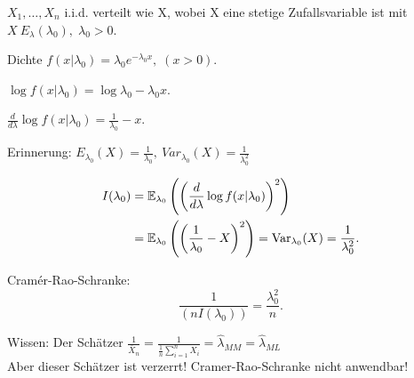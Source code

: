 \documentclass{tstextbook}
\begin{document}
\begin{example}[Exponentialverteilung]
	$ X_1,\ldots,X_n $ i.i.d. verteilt wie X, wobei X eine stetige Zufallsvariable ist
	mit $ X ~ E_{\lambda}(\lambda_0), \; \lambda_0 > 0 $. 
	
	Dichte $ f(x|\lambda_0) = \lambda_0 e^{-\lambda_0 x}, \; (x > 0) $. 
	
	$ \log f(x|\lambda_0) = \log \lambda_0 - \lambda_0 x $. 
	
	$ \frac{d}{d\lambda} \log f(x|\lambda_0) = \frac{1}{\lambda_0} - x $. 
	
	Erinnerung: $E_{\lambda_0}(X) = \frac{1}{\lambda_0}, \ Var_{\lambda_0}(X) =  \frac{1}{\lambda_0^2}  $
	
	\[
	\begin{aligned}
		I(\lambda_0) & = \mathbb E_{\lambda_0} \left(\left(\frac{d}{d\lambda}\log f(x|\lambda_0)\right)^2\right) \\
		& = \mathbb E_{\lambda_0} \left(\left(\frac{1}{\lambda_0}-X\right)^2\right) 
		= \operatorname{Var}_{\lambda_0}(X) 
		= \frac{1}{\lambda_0^2}.
	\end{aligned}
	\]
	
	Cramér-Rao-Schranke: 
	\[
	\frac{1}{\left(nI(\lambda_0)\right)} = \frac{\lambda_0^2}{n}.
	\]
	
	Wissen: Der Schätzer $ \frac{1}{\bar{X}_n} = \frac{1}{\frac{1}{n}\sum_{i=1}^{n}X_i} = \hat{\lambda}_{MM} = \hat{\lambda}_{ML}  $ \\
	Aber dieser Schätzer ist verzerrt! Cramer-Rao-Schranke nicht anwendbar! 
\end{example}
\end{document}
